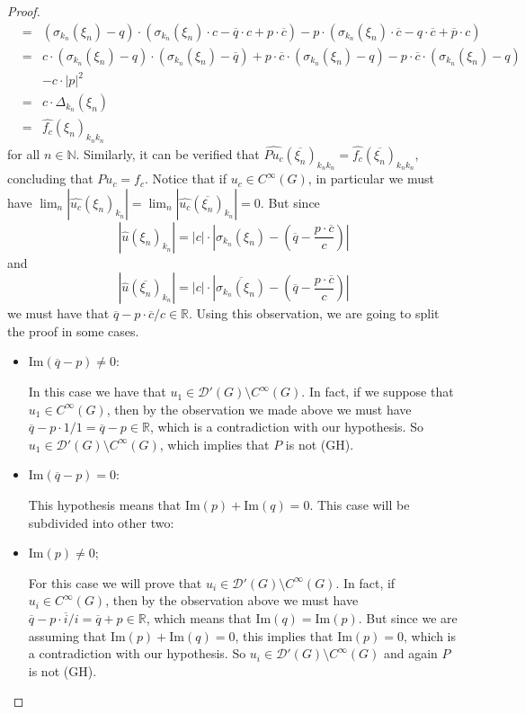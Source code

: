 \documentclass[sn-mathphys-num]{sn-jnl}%
\numberwithin{equation}{section}
\theoremstyle{thmstyleone}
\theoremstyle{thmstyletwo}
\theoremstyle{thmstylethree}
\renewcommand{\Im}{\textrm{Im}}
\begin{document}
\begin{proof}
\begin{eqnarray*}
	& = & (\sigma_{k_n}(\xi_n)-q) \cdot (\sigma_{k_n}(\xi_n)\cdot c-\overline{q}\cdot c +p\cdot \overline{c})-p \cdot (\sigma_{k_n}(\xi_n)\cdot \overline{c}-q \cdot \overline{c}+\overline{p}\cdot c) \\
	& = & c\cdot (\sigma_{k_n}(\xi_n)-q)\cdot (\sigma_{k_n}(\xi_n)-\overline{q})+p \cdot \overline{c}\cdot (\sigma_{k_n}(\xi_n)-q)- p \cdot \overline{c} \cdot(\sigma_{k_n}(\xi_n)-q) \\ 
	&   & -c \cdot |p|^2 \\
	& = & c \cdot \Delta_{k_n}(\xi_n) \\
	& = & \widehat{f_c}(\xi_n)_{k_n k_n}
\end{eqnarray*} 
for all $n \in \mathbb{N}$. Similarly, it can be verified that $\widehat{Pu_c}(\overline{\xi_n})_{k_n k_n}=\widehat{f_c}(\overline{\xi_n})_{k_n k_n}$, concluding that $Pu_c=f_c$. 
Notice that if $u_c \in C^\infty(G)$, in particular we must have $\lim_n |\widehat{u_c}(\xi_n)_{k_n}| = \lim_n |\widehat{u_c}(\overline{\xi_n})_{k_n}|=0$. But since
$$|\widehat{u}(\xi_n)_{k_n}| = |c| \cdot \left|\sigma_{k_n}(\xi_n)-\left(\overline{q}-\frac{p \cdot \overline{c}}{c}\right) \right| $$
and
$$|\widehat{u}(\overline{\xi_n})_{k_n}| = |c| \cdot \left|\overline{\sigma_{k_n}(\xi_n)}-\left(\overline{q}-\frac{p \cdot \overline{c}}{c}\right) \right| $$
we must have that $\overline{q}-p \cdot \overline{c}/c \in \mathbb{R}$. Using this observation, we are going to split the proof in some cases.

\begin{itemize} 
	
\item[1)] $\Im(\overline{q}-p) \neq 0$:

In this case we have that $u_1 \in \mathcal{D}'(G) \setminus C^\infty(G)$. In fact, if we suppose that $u_1 \in C^\infty(G)$, then by the observation we made above we must have $\overline{q}-p\cdot 1/1=\overline{q}-p \in \mathbb{R}$, which is a contradiction with our hypothesis. So $u_1 \in \mathcal{D}'(G) \setminus C^\infty(G)$, which implies that $P$ is not (GH).

\item[2)] $\Im(\overline{q}-p) = 0$:

This hypothesis means that $\Im(p)+\Im(q)=0$. This case will be subdivided into other two:

\item[2.1)] $\Im(p) \neq 0$;

For this case we will prove that $u_i \in \mathcal{D}'(G)\setminus C^\infty(G)$. In fact, if $u_i \in C^\infty(G)$, then by the observation above we must have $\overline{q}-p \cdot \overline{i}/i=\overline{q}+p \in \mathbb{R}$, which means that $\Im(q)=\Im(p)$. But since we are assuming that $\Im(p)+\Im(q)=0$, this implies that $\Im(p) =0$, which is a contradiction with our hypothesis. So $u_i \in \mathcal{D}'(G)\setminus C^\infty(G)$ and again $P$ is not (GH).


\end{itemize}
\end{proof}
\end{document}
